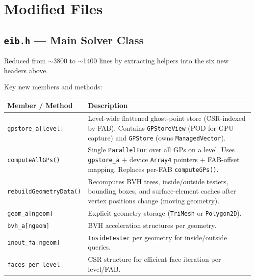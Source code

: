 \documentclass[11pt,a4paper]{article}
\begin{document}
\section{Modified Files}

\subsection{\texttt{eib.h} --- Main Solver Class}

Reduced from $\sim$3800 to $\sim$1400 lines by extracting helpers into
the six new headers above.

Key new members and methods:

\begin{longtable}{p{5cm} p{9cm}}
\toprule
\textbf{Member / Method} & \textbf{Description} \\
\midrule
\texttt{gpstore\_a[level]}
  & Level-wide flattened ghost-point store (CSR-indexed by FAB).
    Contains \texttt{GPStoreView} (POD for GPU capture) and
    \texttt{GPStore} (owns \texttt{ManagedVector}). \\

\texttt{computeAllGPs()}
  & Single \texttt{ParallelFor} over all GPs on a level.  Uses
    \texttt{gpstore\_a} + device \texttt{Array4} pointers + FAB-offset
    mapping.  Replaces per-FAB \texttt{computeGPs()}. \\

\texttt{rebuildGeometryData()}
  & Recomputes BVH trees, inside/outside testers, bounding boxes,
    and surface-element caches after vertex positions change
    (moving geometry). \\

\texttt{geom\_a[ngeom]}
  & Explicit geometry storage (\texttt{TriMesh} or \texttt{Polygon2D}). \\

\texttt{bvh\_a[ngeom]}
  & BVH acceleration structures per geometry. \\

\texttt{inout\_fa[ngeom]}
  & \texttt{InsideTester} per geometry for inside/outside queries. \\

\texttt{faces\_per\_level}
  & CSR structure for efficient face iteration per level/FAB. \\
\bottomrule
\end{longtable}
\end{document}
